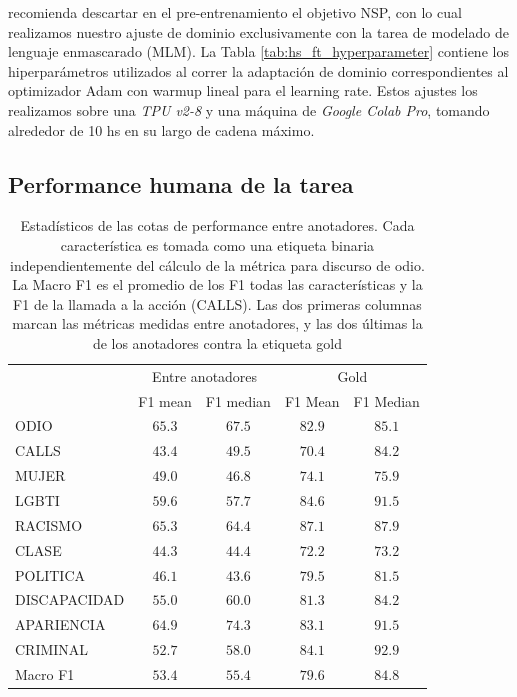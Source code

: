 \cite{liu2019roberta} recomienda descartar en el pre-entrenamiento el objetivo NSP, con lo cual realizamos nuestro ajuste de dominio exclusivamente con la tarea de modelado de lenguaje enmascarado (MLM). La Tabla \ref{tab:hs_ft_hyperparameter} contiene los hiperparámetros utilizados al correr la adaptación de dominio correspondientes al optimizador Adam con warmup lineal para el learning rate. Estos ajustes los realizamos sobre una \emph{TPU v2-8} y una máquina de \emph{Google Colab Pro}, tomando alrededor de 10 hs en su largo de cadena máximo.


\subsection{Performance humana de la tarea}


\begin{table}
    \centering
    \begin{tabular}{l cc  cc}
                   & \multicolumn{2}{c}{Entre anotadores} & \multicolumn{2}{c}{Gold} \\
        {}         &  F1 mean&  F1 median  & F1 Mean  &  F1 Median \\
        \hline
        ODIO       &  $65.3$ &   $67.5$    & $82.9$   &   $85.1$   \\
        CALLS      &  $43.4$ &   $49.5$   &  $70.4$   &   $84.2$  \\
        MUJER      &  $49.0$ &   $46.8$   &  $74.1$   &   $75.9$  \\
        LGBTI      &  $59.6$ &   $57.7$   &  $84.6$   &   $91.5$  \\
        RACISMO    &  $65.3$ &   $64.4$   &  $87.1$   &   $87.9$  \\
        CLASE      &  $44.3$ &   $44.4$   &  $72.2$   &   $73.2$  \\
        POLITICA   &  $46.1$ &   $43.6$   &  $79.5$   &   $81.5$  \\
        DISCAPACIDAD& $55.0$ &   $60.0$   &  $81.3$   &   $84.2$  \\
        APARIENCIA &  $64.9$ &   $74.3$   &  $83.1$   &   $91.5$  \\
        CRIMINAL   &  $52.7$ &   $58.0$   &  $84.1$   &   $92.9$  \\
        Macro F1   &  $53.4$ &   $55.4$   &  $79.6$   &   $84.8$  \\
        \hline
    \end{tabular}

    \caption{Estadísticos de las cotas de performance entre anotadores. Cada característica es tomada como una etiqueta binaria independientemente del cálculo de la métrica para discurso de odio. La Macro F1 es el promedio de los F1 todas las características y la F1 de la llamada a la acción (CALLS). Las dos primeras columnas marcan las métricas medidas entre anotadores, y las dos últimas la de los anotadores contra la etiqueta gold}
    \label{tab:ia_f1_scores}
\end{table}



